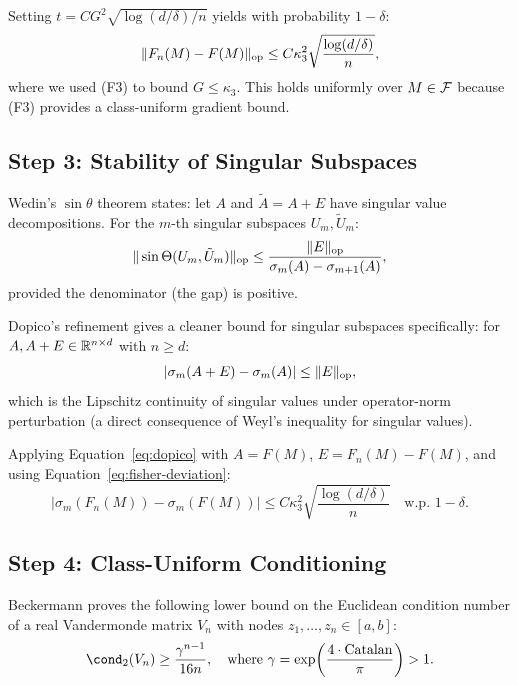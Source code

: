 Setting $t = C G^2 \sqrt{\log(d/\delta)/n}$ yields with probability $1-\delta$:
\begin{equation}\label{eq:fisher-deviation}
    \|F_n(M) - F(M)\|_{\mathrm{op}} \leq C \kappa_3^2 \sqrt{\frac{\log(d/\delta)}{n}},
\end{equation}
where we used (F3) to bound $G \leq \kappa_3$. This holds uniformly over $M \in \mathcal{F}$ because (F3) provides a class-uniform gradient bound.

\subsection{Step 3: Stability of Singular Subspaces}

Wedin's $\sin\theta$ theorem\cite{wedin1972perturbation} states: let $A$ and $\tilde{A} = A + E$ have singular value decompositions. For the $m$-th singular subspaces $U_m, \tilde{U}_m$:
\begin{equation}\label{eq:wedin}
    \|\sin\Theta(U_m, \tilde{U}_m)\|_{\mathrm{op}} \leq \frac{\|E\|_{\mathrm{op}}}{\sigma_m(A) - \sigma_{m+1}(A)},
\end{equation}
provided the denominator (the gap) is positive.

Dopico's refinement\cite{dopico2000sin} gives a cleaner bound for singular subspaces specifically: for $A, A+E \in \mathbb{R}^{n \times d}$ with $n \geq d$:
\begin{equation}\label{eq:dopico}
    |\sigma_m(A+E) - \sigma_m(A)| \leq \|E\|_{\mathrm{op}},
\end{equation}
which is the Lipschitz continuity of singular values under operator-norm perturbation (a direct consequence of Weyl's inequality for singular values).

Applying Equation~\eqref{eq:dopico} with $A = F(M)$, $E = F_n(M) - F(M)$, and using Equation~\eqref{eq:fisher-deviation}:
\begin{equation}\label{eq:singular-stability}
    |\sigma_m(F_n(M)) - \sigma_m(F(M))| \leq C \kappa_3^2 \sqrt{\frac{\log(d/\delta)}{n}} \quad \text{w.p. } 1-\delta.
\end{equation}

\subsection{Step 4: Class-Uniform Conditioning}

Beckermann\cite{beckermann2000condition} proves the following lower bound on the Euclidean condition number of a real Vandermonde matrix $V_n$ with nodes $z_1, \dots, z_n \in [a,b]$:
\begin{equation}\label{eq:beckermann}
    \cond_2(V_n) \geq \frac{\gamma^{n-1}}{16n}, \quad \text{where } \gamma = \exp\!\left(\frac{4 \cdot \text{Catalan}}{\pi}\right) > 1.
\end{equation}

